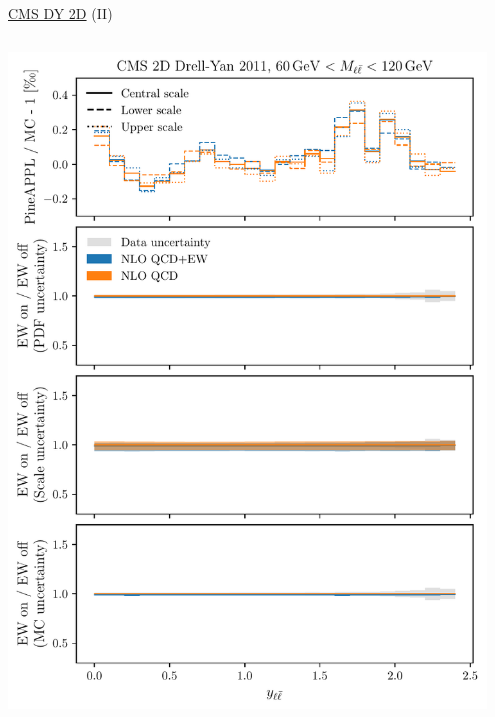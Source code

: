 \begin{frame}{\href{https://arxiv.org/abs/1412.1115}{CMS DY 2D} (II)}
\begin{columns}
\begin{column}{0.5\textwidth}
\includegraphics[width=0.95\textwidth]{ew_corrections/figures/pineappl_CMSDY2D11_bin4}
\end{column}
\end{columns}
\end{frame}

